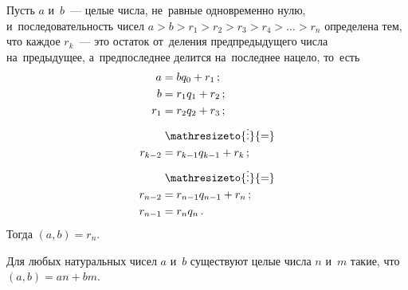 


Пусть $a$ и~$b$~--- целые числа, не~равные одновременно нулю,
и~последовательность чисел
$a > b > r_{1} > r_{2} > r_{3} > r_{4} > \ldots > r_{n}$
определена тем, что каждое $r_k$~--- это остаток от~деления предпредыдущего
числа на~предыдущее, а~предпоследнее делится на~последнее нацело, то~есть
\begin{align*}
    a &= b q_0 + r_1
\, ; \\
    b &= r_1 q_1 + r_2
\, ; \\
    r_{1} &= r_2q_2 + r_3
\, ; \\ & \mathrel{\mathresizeto{\vdots}{=}} \\
    r_{k-2} &= r_{k-1} q_{k-1} + r_{k}
\, ; \\ & \mathrel{\mathresizeto{\vdots}{=}} \\
    r_{n-2} &= r_{n-1} q_{n-1} + r_n
\, ; \\
    r_{n-1} &= r_{n} q_{n}
\, . \end{align*}
Тогда $(a, b) = r_{n}$.

Для любых натуральных чисел $a$ и~$b$ существуют целые числа $n$ и~$m$ такие,
что $(a, b) = a n + b m$.

